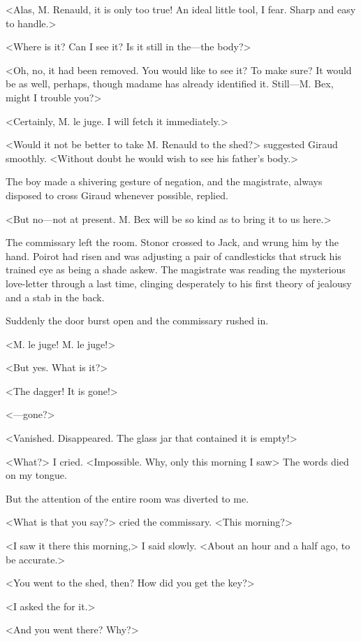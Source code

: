  <Alas, M. Renauld, it is only too true! An ideal little tool, I fear. Sharp and easy to handle.> 

 <Where is it? Can I see it? Is it still in the—the body?> 

 <Oh, no, it had been removed. You would like to see it? To make sure? It would be as well, perhaps, though madame has already identified it. Still—M. Bex, might I trouble you?> 

 <Certainly, M. le juge. I will fetch it immediately.> 

 <Would it not be better to take M. Renauld to the shed?> suggested Giraud smoothly. <Without doubt he would wish to see his father's body.> 

 The boy made a shivering gesture of negation, and the magistrate, always disposed to cross Giraud whenever possible, replied. 

 <But no—not at present. M. Bex will be so kind as to bring it to us here.> 

 The commissary left the room. Stonor crossed to Jack, and wrung him by the hand. Poirot had risen and was adjusting a pair of candlesticks that struck his trained eye as being a shade askew. The magistrate was reading the mysterious love-letter through a last time, clinging desperately to his first theory of jealousy and a stab in the back. 

 Suddenly the door burst open and the commissary rushed in. 

 <M. le juge! M. le juge!> 

 <But yes. What is it?> 

 <The dagger! It is gone!> 

 <—gone?> 

 <Vanished. Disappeared. The glass jar that contained it is empty!> 

 <What?> I cried. <Impossible. Why, only this morning I saw\longdash> The words died on my tongue. 

 But the attention of the entire room was diverted to me. 

 <What is that you say?> cried the commissary. <This morning?> 

 <I saw it there this morning,> I said slowly. <About an hour and a half ago, to be accurate.> 

 <You went to the shed, then? How did you get the key?> 

 <I asked the  for it.> 

 <And you went there? Why?> 

